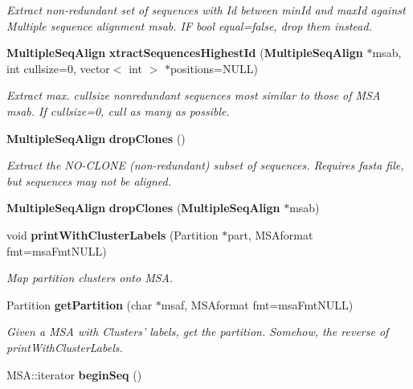 \begin{CompactItemize}
\begin{CompactList}\small\item\em Extract non-redundant set of sequences with Id between min\-Id and max\-Id against Multiple sequence alignment msab. IF bool equal=false, drop them instead. \item\end{CompactList}\item 
{\bf Multiple\-Seq\-Align} {\bf xtract\-Sequences\-Highest\-Id} ({\bf Multiple\-Seq\-Align} $\ast$msab, int cullsize=0, vector$<$ int $>$ $\ast$positions=NULL)\label{classMultipleSeqAlign_a6}

\begin{CompactList}\small\item\em Extract max. cullsize nonredundant sequences most similar to those of MSA msab. If cullsize=0, cull as many as possible. \item\end{CompactList}\item 
{\bf Multiple\-Seq\-Align} {\bf drop\-Clones} ()\label{classMultipleSeqAlign_a7}

\begin{CompactList}\small\item\em Extract the NO-CLONE (non-redundant) subset of sequences. Requires fasta file, but sequences may not be aligned. \item\end{CompactList}\item 
{\bf Multiple\-Seq\-Align} {\bf drop\-Clones} ({\bf Multiple\-Seq\-Align} $\ast$msab)\label{classMultipleSeqAlign_a8}

\item 
void {\bf print\-With\-Cluster\-Labels} (Partition $\ast$part, MSAformat fmt=msa\-Fmt\-NULL)\label{classMultipleSeqAlign_a9}

\begin{CompactList}\small\item\em Map partition clusters onto MSA. \item\end{CompactList}\item 
Partition {\bf get\-Partition} (char $\ast$msaf, MSAformat fmt=msa\-Fmt\-NULL)\label{classMultipleSeqAlign_a10}

\begin{CompactList}\small\item\em Given a MSA with Clusters' labels, get the partition. Somehow, the reverse of print\-With\-Cluster\-Labels. \item\end{CompactList}\item 
MSA::iterator {\bf begin\-Seq} ()\label{classMultipleSeqAlign_a11}


\end{CompactItemize}
